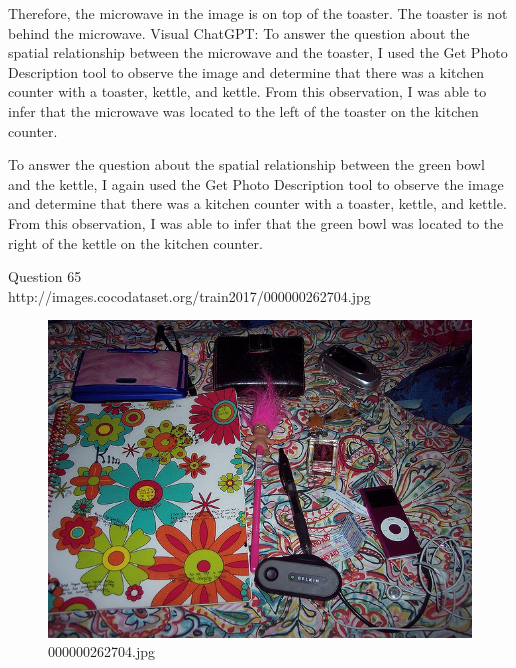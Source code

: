 \begin{enumerate}
    Therefore, the microwave in the image is on top of the toaster. The toaster is not behind the microwave.
    \subitem Visual ChatGPT: 
    To answer the question about the spatial relationship between the microwave and the toaster, I used the Get Photo Description tool to observe the image and determine that there was a kitchen counter with a toaster, kettle, and kettle. From this observation, I was able to infer that the microwave was located to the left of the toaster on the kitchen counter.
    
    To answer the question about the spatial relationship between the green bowl and the kettle, I again used the Get Photo Description tool to observe the image and determine that there was a kitchen counter with a toaster, kettle, and kettle. From this observation, I was able to infer that the green bowl was located to the right of the kettle on the kitchen counter.
\end{enumerate}
Question 65\\
http://images.cocodataset.org/train2017/000000262704.jpg
\begin{figure}[h]
    \centering
    \includegraphics[width=0.8\linewidth]{../image set/hard/000000262704.jpg}
    \caption{000000262704.jpg}
\end{figure}
